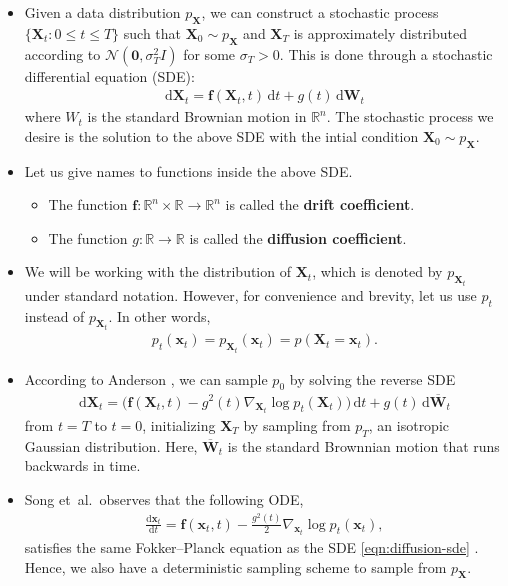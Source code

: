\documentclass[10pt]{article}
\newcommand{\dee}{\mathrm{d}}
\newcommand{\ve}[1]{\mathbf{#1}}
\newcommand{\etal}{{et~al.}}
\newcommand{\ra}{\rightarrow}
\newcommand{\mcal}[1]{\mathcal{#1}}
\newcommand{\Real}{\mathbb{R}}
\begin{document}
\begin{itemize}
  \item Given a data distribution $p_{\ve{X}}$, we can construct a stochastic process $\{ \ve{X}_t : 0 \leq t \leq T \}$ such that $\ve{X}_0 \sim p_\ve{X}$ and $\ve{X}_T$ is approximately distributed according to $\mcal{N}(\ve{0}, \sigma_T^2 I)$ for some $\sigma_T > 0$. This is done through a stochastic differential equation (SDE):
  \begin{align}
    \dee \ve{X}_t = \ve{f}(\ve{X}_t, t)\, \dee t + g(t)\, \dee \ve{W}_t \label{eqn:diffusion-sde}
  \end{align}
  where $W_t$ is the standard Brownian motion in $\Real^n$. The stochastic process we desire is the solution to the above SDE with the intial condition $\ve{X}_0 \sim p_\ve{X}$.
  
  \item Let us give names to functions inside the above SDE.
  \begin{itemize}
    \item The function $\ve{f}: \Real^n \times \Real \ra \Real^n$ is called the \textbf{drift coefficient}.
    \item The function $g: \Real \ra \Real$ is called the \textbf{diffusion coefficient}.    
  \end{itemize}

  \item We will be working with the distribution of $\ve{X}_t$, which is denoted by $p_{\ve{X}_t}$ under standard notation. However, for convenience and brevity, let us use $p_t$ instead of $p_{\ve{X}_t}$. In other words,
  \begin{align*}
    p_t(\ve{x}_t) = p_{\ve{X}_t}(\ve{x}_t) = p(\ve{X}_t = \ve{x}_t).
  \end{align*}

  \item According to Anderson \cite{Anderson:1982}, we can sample $p_0$ by solving the reverse SDE
  \begin{align}
    \dee \ve{X}_t = \Big( \ve{f}(\ve{X}_t, t) - g^2(t) \nabla_{\ve{X}_t} \log p_t(\ve{X}_t) \Big)\, \dee t + g(t)\, \dee \overline{\ve{W}}_t \label{eqn:reverse-time-sde}
  \end{align}
  from $t=T$ to $t=0$, initializing $\ve{X}_T$ by sampling from $p_T$, an isotropic Gaussian distribution. Here, $\overline{\ve{W}}_t$ is the standard Brownnian motion that runs backwards in time.

  \item Song \etal\ observes that the following ODE,
  \begin{align}
    \frac{\dee \ve{x}_t}{\dee t} = \ve{f}(\ve{x}_t, t) - \frac{g^2(t)}{2} \nabla_{\ve{x}_t} \log p_t(\ve{x}_t), \label{eqn:probability-flow-ode}
  \end{align}
  satisfies the same Fokker--Planck equation as the SDE \eqref{eqn:diffusion-sde} \cite{Song:SDE:2021}. Hence, we also have a deterministic sampling scheme to sample from $p_\ve{X}$.


\end{itemize}
\end{document}
